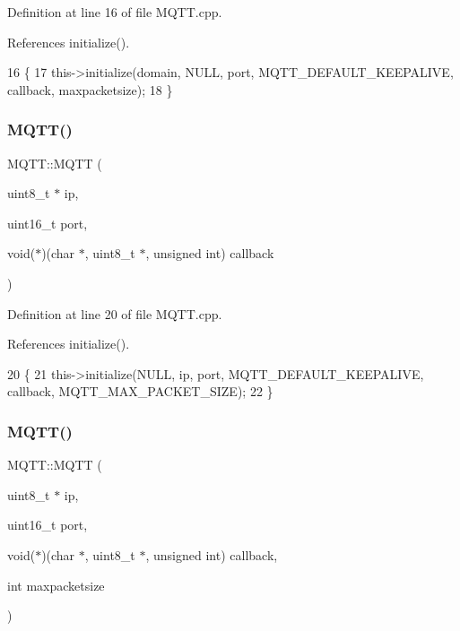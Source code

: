 Definition at line 16 of file M\+Q\+T\+T.\+cpp.



References initialize().


\begin{DoxyCode}
16                                                                                                         \{
17     this->initialize(domain, NULL, port, MQTT_DEFAULT_KEEPALIVE, callback, 
      maxpacketsize);
18 \}
\end{DoxyCode}
\mbox{\label{class_m_q_t_t_a0e4560eca8b493628aed67f949b45d42}} 
\subsubsection{M\+Q\+T\+T()\hspace{0.1cm}{\footnotesize\ttfamily [4/9]}}
{\footnotesize\ttfamily M\+Q\+T\+T\+::\+M\+Q\+TT (\begin{DoxyParamCaption}\item[{uint8\+\_\+t $\ast$}]{ip,  }\item[{uint16\+\_\+t}]{port,  }\item[{void($\ast$)(char $\ast$, uint8\+\_\+t $\ast$, unsigned int)}]{callback }\end{DoxyParamCaption})}



Definition at line 20 of file M\+Q\+T\+T.\+cpp.



References initialize().


\begin{DoxyCode}
20                                                                                     \{
21     this->initialize(NULL, ip, port, MQTT_DEFAULT_KEEPALIVE, callback, 
      MQTT_MAX_PACKET_SIZE);
22 \}
\end{DoxyCode}
\mbox{\label{class_m_q_t_t_a39e00a946c41fbe9eb504577269569cc}} 
\subsubsection{M\+Q\+T\+T()\hspace{0.1cm}{\footnotesize\ttfamily [5/9]}}
{\footnotesize\ttfamily M\+Q\+T\+T\+::\+M\+Q\+TT (\begin{DoxyParamCaption}\item[{uint8\+\_\+t $\ast$}]{ip,  }\item[{uint16\+\_\+t}]{port,  }\item[{void($\ast$)(char $\ast$, uint8\+\_\+t $\ast$, unsigned int)}]{callback,  }\item[{int}]{maxpacketsize }\end{DoxyParamCaption})}



